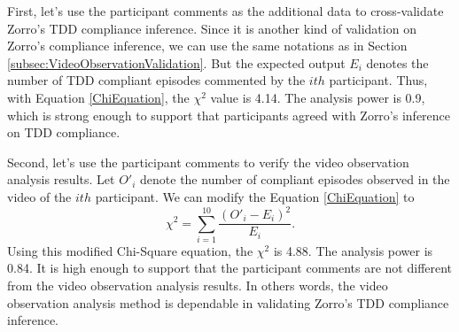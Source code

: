 First, let's use the participant comments as the additional data to 
cross-validate Zorro's TDD compliance inference. Since it is another
kind of validation on Zorro's compliance inference, we can use
the same notations as in Section \ref{subsec:VideoObservationValidation}.
But the expected output \begin{math}E_{i}\end{math} denotes the 
number of TDD compliant episodes commented by the \begin{math}ith\end{math} 
participant. Thus, with Equation \ref{ChiEquation}, the \begin{math}\chi^2\end{math} 
value is 4.14. The analysis power is 0.9, which is strong enough to 
support that participants agreed with Zorro's inference on TDD 
compliance.

Second, let's use the participant comments to verify the video
observation analysis results. Let \begin{math}O'_{i}\end{math} denote 
the number of compliant episodes observed in the video of
the \begin{math}ith\end{math} participant. We can modify the
Equation \ref{ChiEquation} to  
\begin{equation} \label{ChiVerifyEquation}
  \chi^2 = \sum_{i=1}^{10}\frac{(O'_{i}-E_{i})^2}{E_{i}}.
\end{equation}
Using this modified Chi-Square equation, the \begin{math}\chi^2\end{math} 
is 4.88. The analysis power is 0.84. It is high enough to support
that the participant comments are not different from the video 
observation analysis results. In others words, the video observation
analysis method is dependable in validating Zorro's TDD compliance
inference.

